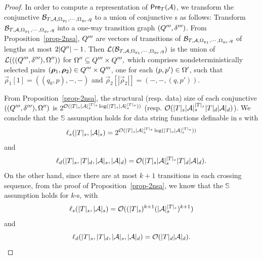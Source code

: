 \begin{proof}
In order to compute a representation of $\textsf{Pre}_{T}(\mathcal{A})$, we transform the conjunctive \SSA{} $\mathcal{B}_{T, \mathcal{A}, \Omega_{y_1}, \cdots, \Omega_{y_r},q}$ to a union of conjunctive \SA{}s as follows: Transform $\mathcal{B}_{T, \mathcal{A}, \Omega_{y_1}, \cdots, \Omega_{y_r}, q}$ into a one-way transition graph $(Q''',\delta''')$. From Proposition~\ref{prop-2nsa}, $Q'''$ are vectors of transitions of $\mathcal{B}_{T, \mathcal{A}, \Omega_{y_1}, \cdots, \Omega_{y_r}, q}$ of lengths at most $2|Q''|-1$. Then $\mathcal{L}(\mathcal{B}_{T, \mathcal{A}, \Omega_{y_1}, \cdots, \Omega_{y_r},q})$ is the union of $\mathcal{L}(((Q''',\delta'''), \Omega''))$ for $\Omega'' \subseteq Q''' \times Q''',$ which comprises nondeterministically selected pairs $(\vec{\rho}_1, \vec{\rho}_2) \in \controls''' \times \controls'''$, one for each $(p, p') \in \Omega'$, such that $\vec{\rho}_1[1] = ((q_0, p), -, -)$ and  $\vec{\rho}_2[|\vec{\rho}_2|] = (-, -, (q, p'))$.

From Proposition~\ref{prop-2nsa}, the structural (resp. data) size of each conjunctive \SA{} $((Q''',\delta'''), \Omega'')$
is  $ 2^{\mathcal{O}( |T|_s |\mathcal{A}|_s^{|T|_s} \log (|T|_s |\mathcal{A}|_s^{|T|_s}))}$ 
(resp. $ \mathcal{O}( |T|_s |\mathcal{A}|_s^{|T|_s} |T|_d |\mathcal{A}|_d )$). 
We conclude that 
the $\mathbb{S}$\prerec{} assumption holds for data string functions definable in \SSPT{}s with 
%
$$\ell_s(|T|_s, |\mathcal{A}|_s) = 2^{\mathcal{O}( |T|_s |\mathcal{A}|_s^{|T|_s} \log (|T|_s |\mathcal{A}|_s^{|T|_s}))}$$
 and 
$$\ell_d(|T|_s, |T|_d, |\mathcal{A}|_s, |\mathcal{A}|_d) = \mathcal{O}(|T|_s |\mathcal{A}|_s^{|T|_s} |T|_d |\mathcal{A}|_d).
$$
%
On the other hand, since there are at most $k+1$ transitions in each crossing sequence, from the proof of Proposition~\ref{prop-2nsa}, we know that the $\mathbb{S}$\prerec{} assumption holds for $k$-\SSPT{}s, with 
$$\ell_s(|T|_s, |\mathcal{A}|_s) = \mathcal{O}((|T|_s)^{k+1} (|\mathcal{A}|_s^{|T|_s})^{k+1})$$ 
and  
$$\ell_d(|T|_s, |T|_d, |\mathcal{A}|_s, |\mathcal{A}|_d) = \mathcal{O}(|T|_d |\mathcal{A}|_d).$$
\end{proof}



